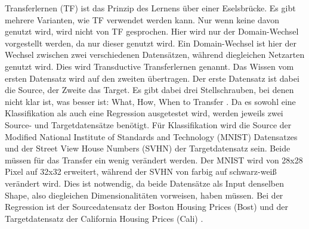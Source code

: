 Transferlernen (TF) ist das Prinzip des Lernens über einer Eselsbrücke. 
Es gibt mehrere Varianten, wie TF verwendet werden kann. Nur wenn keine davon genutzt wird, wird nicht von TF gesprochen. 
Hier wird nur der Domain-Wechsel vorgestellt werden, da nur dieser genutzt wird. Ein Domain-Wechsel ist hier der Wechsel 
zwischen zwei verschiedenen Datensätzen, während diegleichen Netzarten genutzt wird. 
Dies wird Transductive Transferlernen\cite{survey_transfer} genannt. 
Das Wissen vom ersten Datensatz wird auf den zweiten übertragen. Der erste Datensatz ist dabei die Source, der Zweite das Target. 
Es gibt dabei drei Stellschrauben, bei denen nicht klar ist, was besser ist: What, How, When to Transfer \cite{survey_transfer}. 
Da es sowohl eine Klassifikation als auch eine Regression ausgetestet wird, werden jeweils zwei Source- und Targetdatensätze benötigt. 
Für Klassifikation wird die Source der Modified National Institute of Standards and Technology \cite{handwritten_digit} (MNIST) Datensatzes  
und der 
Street View House Numbers (SVHN) \cite{house_numbers} der Targetdatensatz sein. Beide müssen für das Transfer ein wenig 
verändert werden. Der MNIST wird von 28x28 Pixel auf 32x32 erweitert, während der SVHN von farbig auf schwarz-weiß verändert wird. 
Dies ist notwendig, da beide Datensätze als Input denselben Shape, also diegleichen Dimensionalitäten vorweisen, haben müssen. 
Bei der Regression ist der Sourcedatensatz der Boston Housing Prices (Bost) \cite{Boston_housing} und der Targetdatensatz der 
California Housing Prices (Cali) \cite{California_housing}. 

